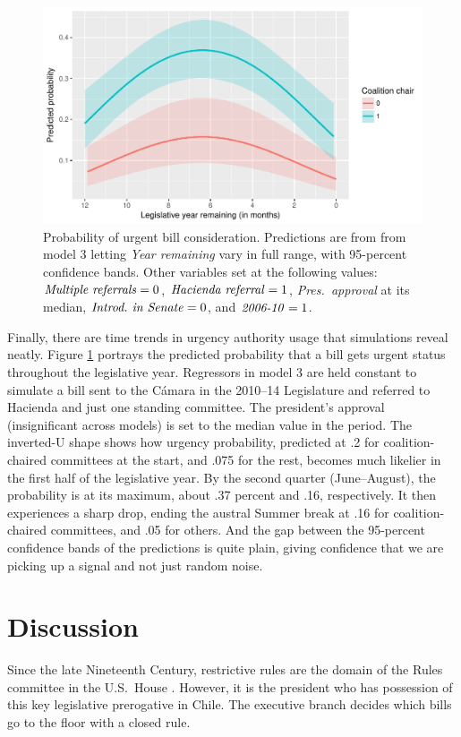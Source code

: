 \documentclass[letter,12pt]{article}
\begin{document}
\begin{figure}
  \centering
    \caption{Probability of urgent bill consideration. Predictions are from from model 3 letting \emph{Year remaining} vary in full range, with 95-percent confidence bands. Other variables set at the following values: $\text{\emph{Multiple referrals}}=0$, $\text{\emph{Hacienda referral}}=1$, \emph{Pres.~approval} at its median, $\text{\emph{Introd.~in~Senate}}=0$, and $\text{\emph{2006-10}}=1$.}\label{F:sims}
    \includegraphics[width=.75\columnwidth]{../graphs/predictedPr.pdf}
\end{figure}

Finally, there are time trends in urgency authority usage that simulations reveal neatly. Figure \ref{F:sims} portrays the predicted probability that a bill gets urgent status throughout the legislative year. Regressors in model 3 are held constant to simulate a bill sent to the Cámara in the 2010--14 Legislature and referred to Hacienda and just one standing committee. The president's approval (insignificant across models) is set to the median value in the period. The inverted-U shape shows how urgency probability, predicted at .2 for coalition-chaired committees at the start, and .075 for the rest, becomes much likelier in the first half of the legislative year. By the second quarter (June--August), the probability is at its maximum, about .37 percent and .16, respectively. It then experiences a sharp drop, ending the austral Summer break at .16 for coalition-chaired committees, and .05 for others. And the gap between the 95-percent confidence bands of the predictions is quite plain, giving confidence that we are picking up a signal and not just random noise. 

\section{Discussion}

Since the late Nineteenth Century, restrictive rules are the domain of the Rules committee in the U.S.\ House \citep{denhartog.2004phd,cox.mccubbins.2005,sin.2014}. However, it is the president who has possession of this key legislative prerogative in Chile. The executive branch decides which bills go to the floor with a closed rule. 
\end{document}
